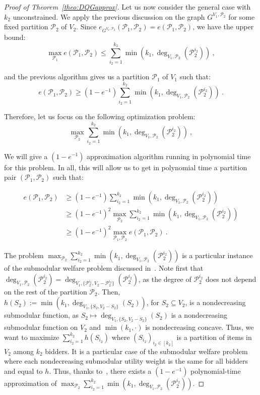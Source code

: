 \begin{proof}[Proof of Theorem~\ref{theo:DQGapprox}]
Let us now consider the general case with $k_2$ unconstrained. We apply the previous discussion on the graph $G^{V_1,\mathcal{P}_2}$ for some fixed partition $\mathcal{P}_2$ of $V_2$. Since $e_{G^{V_1,\mathcal{P}_2}}(\mathcal{P}_1,\mathcal{P}_2) = e(\mathcal{P}_1,\mathcal{P}_2)$, we have the upper bound:
\[ \max_{\mathcal{P}_1} e(\mathcal{P}_1,\mathcal{P}_2) \leq \sum_{i_2=1}^{k_2}\min\left(k_1,\deg_{V_1,\mathcal{P}_2}(\mathcal{P}_2^{i_2})\right) \ , \]

and the previous algorithm gives us a partition $\mathcal{P}_1$ of $V_1$ such that:
\[ e(\mathcal{P}_1,\mathcal{P}_2) \geq (1-e^{-1})\sum_{i_2=1}^{k_2}\min\left(k_1,\deg_{V_1,\mathcal{P}_2}(\mathcal{P}_2^{i_2})\right)\ . \]

Therefore, let us focus on the following optimization problem:
\[\max_{\mathcal{P}_2}\sum_{i_2=1}^{k_2}\min\left(k_1,\deg_{V_1,\mathcal{P}_2}(\mathcal{P}_2^{i_2})\right) \ , \]

We will give a $(1-e^{-1})$ approximation algorithm running in polynomial time for this problem. In all, this will allow us to get in polynomial time a partition pair $(\mathcal{P}_1,\mathcal{P}_2)$ such that:

\begin{equation}
  \begin{aligned}
    e(\mathcal{P}_1,\mathcal{P}_2) &\geq (1-e^{-1})\sum_{i_2=1}^{k_2}\min\left(k_1,\deg_{V_1,\mathcal{P}_2}(\mathcal{P}_2^{i_2})\right)\\
    &\geq (1-e^{-1})^2\max_{\mathcal{P}_2}\sum_{i_2=1}^{k_2}\min\left(k_1,\deg_{V_1,\mathcal{P}_2}(\mathcal{P}_2^{i_2})\right)\\
    &\geq (1-e^{-1})^2\max_{\mathcal{P}_1,\mathcal{P}_2} e(\mathcal{P}_1,\mathcal{P}_2) \ .
  \end{aligned}
\end{equation}

The problem $\max_{\mathcal{P}_2}\sum_{i_2=1}^{k_2}\min\left(k_1,\deg_{V_1,\mathcal{P}_2}(\mathcal{P}_2^{i_2})\right)$ is a particular instance of the submodular welfare problem discussed in~\cite{Vondrak08}. Note first that $\deg_{V_1,\mathcal{P}_2}(\mathcal{P}_2^{i_2}) = \deg_{V_1,\{\mathcal{P}_2^{i_2}, V_2-\mathcal{P}_2^{i_2}\}}(\mathcal{P}_2^{i_2})$, as the degree of $\mathcal{P}_2^{i_2}$ does not depend on the rest of the partition $\mathcal{P}_2$. Then, $h(S_2) := \min\left(k_1,\deg_{V_1,\{S_2,V_2-S_2\}}(S_2)\right)$, for $S_2 \subseteq V_2$, is a nondecreasing submodular function, as $S_2 \mapsto \deg_{V_1,\{S_2,V_2-S_2\}}(S_2)$ is a nondecreasing submodular function on $V_2$ and $\min(k_1,\cdot)$ is nondecreasing concave. Thus, we want to maximize $\sum_{i_2=1}^{k_2}h(S_{i_2})$ where $(S_{i_2})_{i_2 \in [k_2]}$ is a partition of items in $V_2$ among $k_2$ bidders. It is a particular case of the submodular welfare problem where each nondecreasing submodular utility weight is the same for all bidders and equal to $h$. Thus, thanks to~\cite{Vondrak08}, there exists a $(1-e^{-1})$ polynomial-time approximation of $\max_{\mathcal{P}_2}\sum_{i_2=1}^{k_2}\min\left(k_1,\deg_{V_1,\mathcal{P}_2}(\mathcal{P}_2^{i_2})\right)$.
\end{proof}

